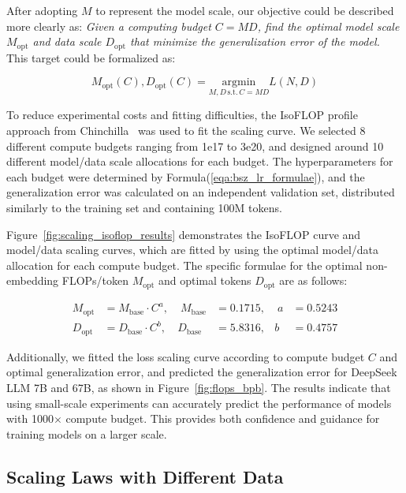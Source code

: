 After adopting $M$ to represent the model scale, our objective could be described more clearly as: \emph{Given a computing budget $C=MD$, find the optimal model scale $M_{\mathrm{opt}}$ and data scale $D_{\mathrm{opt}}$ that minimize the generalization error of the model.} This target could be formalized as:

\begin{equation}
    M_{\mathrm{opt}}(C), D_{\mathrm{opt}}(C) = \underset{M, D\,\mathrm{s.t.}\,C=MD}{\mathrm{argmin}} L(N, D)
\end{equation}

To reduce experimental costs and fitting difficulties, the IsoFLOP profile approach from Chinchilla~\citep{chinchilla} was used to fit the scaling curve. We selected 8 different compute budgets ranging from 1e17 to 3e20, and designed around 10 different model/data scale allocations for each budget. The hyperparameters for each budget were determined by Formula(\ref{eqa:bsz_lr_formulae}), and the generalization error was calculated on an independent validation set, distributed similarly to the training set and containing 100M tokens.

Figure~\ref{fig:scaling_isoflop_results} demonstrates the IsoFLOP curve and model/data scaling curves, which are fitted by using the optimal model/data allocation for each compute budget. The specific formulae for the optimal non-embedding FLOPs/token $M_{\mathrm{opt}}$ and optimal tokens $D_{\mathrm{opt}}$ are as follows:

\begin{equation}
\label{eqa:m_d_formulae}
\begin{aligned}
    M_{\mathrm{opt}} &= M_{\mathrm{base}}\cdot C^{a}, &\; M_{\mathrm{base}} &= 0.1715, &\; a &= 0.5243 \\
    D_{\mathrm{opt}} &= D_{\mathrm{base}}\cdot C^{b}, & D_{\mathrm{base}} &= 5.8316, & b &= 0.4757
\end{aligned}
\end{equation}

Additionally, we fitted the loss scaling curve according to compute budget $C$ and optimal generalization error, and predicted the generalization error for DeepSeek LLM 7B and 67B, as shown in Figure~\ref{fig:flops_bpb}. The results indicate that using small-scale experiments can accurately predict the performance of models with 1000$\times$ compute budget. This provides both confidence and guidance for training models on a larger scale.

\subsection{Scaling Laws with Different Data}

